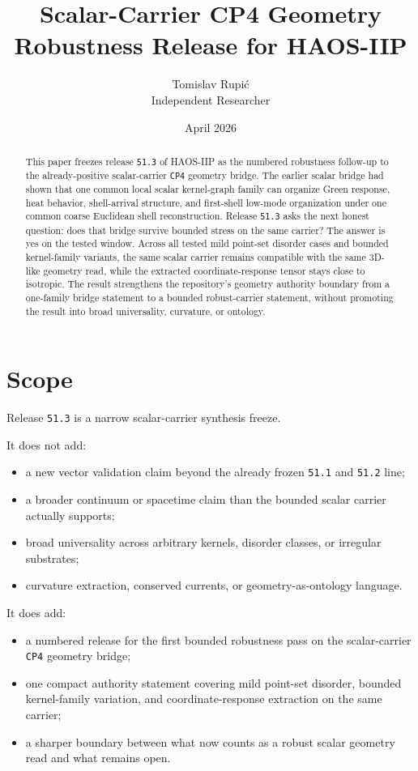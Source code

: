 \documentclass[11pt]{article}
\title{Scalar-Carrier CP4 Geometry Robustness Release for HAOS-IIP}
\author{Tomislav Rupi\'c \\ Independent Researcher}
\date{April 2026}
\begin{document}
\maketitle

\begin{abstract}
This paper freezes release \texttt{51.3} of HAOS-IIP as the numbered robustness follow-up to the already-positive scalar-carrier \texttt{CP4} geometry bridge. The earlier scalar bridge had shown that one common local scalar kernel-graph family can organize Green response, heat behavior, shell-arrival structure, and first-shell low-mode organization under one common coarse Euclidean shell reconstruction. Release \texttt{51.3} asks the next honest question: does that bridge survive bounded stress on the same carrier? The answer is yes on the tested window. Across all tested mild point-set disorder cases and bounded kernel-family variants, the same scalar carrier remains compatible with the same 3D-like geometry read, while the extracted coordinate-response tensor stays close to isotropic. The result strengthens the repository's geometry authority boundary from a one-family bridge statement to a bounded robust-carrier statement, without promoting the result into broad universality, curvature, or ontology.
\end{abstract}

\tableofcontents

\section{Scope}

Release \texttt{51.3} is a narrow scalar-carrier synthesis freeze.

It does not add:
\begin{itemize}
\item a new vector validation claim beyond the already frozen \texttt{51.1} and \texttt{51.2} line;
\item a broader continuum or spacetime claim than the bounded scalar carrier actually supports;
\item broad universality across arbitrary kernels, disorder classes, or irregular substrates;
\item curvature extraction, conserved currents, or geometry-as-ontology language.
\end{itemize}

It does add:
\begin{itemize}
\item a numbered release for the first bounded robustness pass on the scalar-carrier \texttt{CP4} geometry bridge;
\item one compact authority statement covering mild point-set disorder, bounded kernel-family variation, and coordinate-response extraction on the same carrier;
\item a sharper boundary between what now counts as a robust scalar geometry read and what remains open.
\end{itemize}
\end{document}
